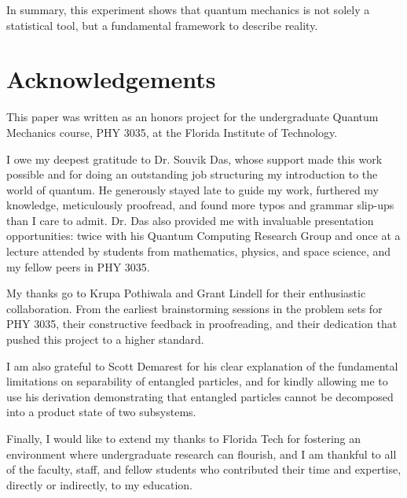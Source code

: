 \documentclass[12pt]{article}
\begin{document}
In summary, this experiment shows that quantum mechanics is not solely a statistical tool, but a fundamental framework to describe reality. 

\newpage

\section{Acknowledgements}

This paper was written as an honors project for the undergraduate Quantum Mechanics course, PHY 3035, at the Florida Institute of Technology. 

I owe my deepest gratitude to Dr. Souvik Das, whose support made this work possible and for doing an outstanding job structuring my introduction to the world of quantum. He generously stayed late to guide my work, furthered my knowledge, meticulously proofread, and found more typos and grammar slip-ups than I care to admit. Dr. Das also provided me with invaluable presentation opportunities: twice with his Quantum Computing Research Group and once at a lecture attended by students from mathematics, physics, and space science, and my fellow peers in PHY 3035.

My thanks go to Krupa Pothiwala and Grant Lindell for their enthusiastic collaboration. From the earliest brainstorming sessions in the problem sets for PHY 3035, their constructive feedback in proofreading, and their dedication that pushed this project to a higher standard.

I am also grateful to Scott Demarest for his clear explanation of the fundamental limitations on separability of entangled particles, and for kindly allowing me to use his derivation demonstrating that entangled particles cannot be decomposed into a product state of two subsystems.

Finally, I would like to extend my thanks to Florida Tech for fostering an environment where undergraduate research can flourish, and I am thankful to all of the faculty, staff, and fellow students who contributed their time and expertise, directly or indirectly, to my education.

\newpage
\end{document}
